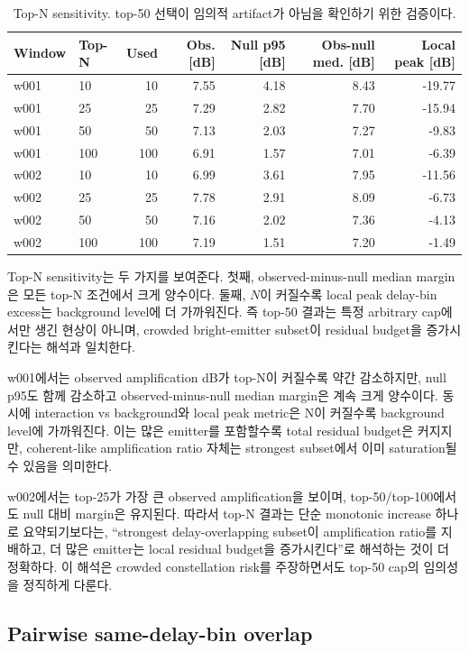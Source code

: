 \documentclass[11pt,a4paper]{article}
\begin{document}
\begin{table}[t]
\centering
\caption{Top-N sensitivity. top-50 선택이 임의적 artifact가 아님을 확인하기 위한 검증이다.}
\label{tab:topn}
\begin{tabular}{llrrrrr}
\toprule
Window & Top-N & Used & Obs. [dB] & Null p95 [dB] & Obs-null med. [dB] & Local peak [dB]\\
\midrule
w001 & 10  & 10  & 7.55 & 4.18 & 8.43 & -19.77\\
w001 & 25  & 25  & 7.29 & 2.82 & 7.70 & -15.94\\
w001 & 50  & 50  & 7.13 & 2.03 & 7.27 & -9.83\\
w001 & 100 & 100 & 6.91 & 1.57 & 7.01 & -6.39\\
w002 & 10  & 10  & 6.99 & 3.61 & 7.95 & -11.56\\
w002 & 25  & 25  & 7.78 & 2.91 & 8.09 & -6.73\\
w002 & 50  & 50  & 7.16 & 2.02 & 7.36 & -4.13\\
w002 & 100 & 100 & 7.19 & 1.51 & 7.20 & -1.49\\
\bottomrule
\end{tabular}
\end{table}

Top-N sensitivity는 두 가지를 보여준다.
첫째, observed-minus-null median margin은 모든 top-N 조건에서 크게 양수이다.
둘째, $N$이 커질수록 local peak delay-bin excess는 background level에 더 가까워진다.
즉 top-50 결과는 특정 arbitrary cap에서만 생긴 현상이 아니며, crowded bright-emitter subset이 residual budget을 증가시킨다는 해석과 일치한다.

w001에서는 observed amplification dB가 top-N이 커질수록 약간 감소하지만, null p95도 함께 감소하고 observed-minus-null median margin은 계속 크게 양수이다.
동시에 interaction vs background와 local peak metric은 N이 커질수록 background level에 가까워진다.
이는 많은 emitter를 포함할수록 total residual budget은 커지지만, coherent-like amplification ratio 자체는 strongest subset에서 이미 saturation될 수 있음을 의미한다.

w002에서는 top-25가 가장 큰 observed amplification을 보이며, top-50/top-100에서도 null 대비 margin은 유지된다.
따라서 top-N 결과는 단순 monotonic increase 하나로 요약되기보다는, ``strongest delay-overlapping subset이 amplification ratio를 지배하고, 더 많은 emitter는 local residual budget을 증가시킨다''로 해석하는 것이 더 정확하다.
이 해석은 crowded constellation risk를 주장하면서도 top-50 cap의 임의성을 정직하게 다룬다.

\subsection{Pairwise same-delay-bin overlap}
\end{document}

